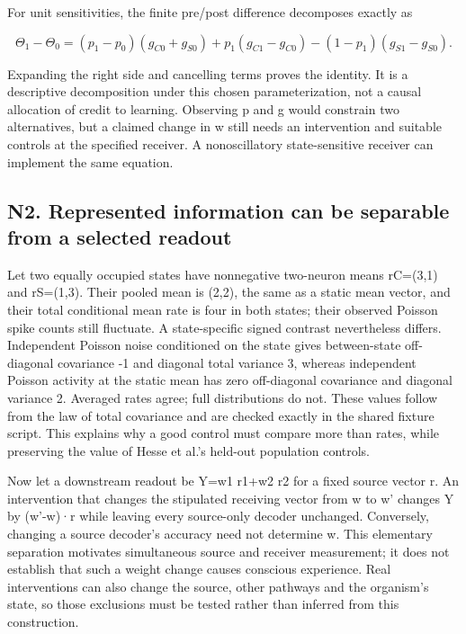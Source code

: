 \documentclass[
  american,
  11pt,
  letterpaper,
]{article}
\begin{document}
For unit sensitivities, the finite pre/post difference decomposes exactly as

\begin{equation}
\Theta_1-\Theta_0=(p_1-p_0)(g_{C0}+g_{S0})+p_1(g_{C1}-g_{C0})-(1-p_1)(g_{S1}-g_{S0}).\tag{N2}
\end{equation}

Expanding the right side and cancelling terms proves the identity. It is a descriptive decomposition under this chosen parameterization, not a causal allocation of credit to learning. Observing p and g would constrain two alternatives, but a claimed change in w still needs an intervention and suitable controls at the specified receiver. A nonoscillatory state-sensitive receiver can implement the same equation.

\subsection{N2. Represented information can be separable from a selected readout}\label{n2.-represented-information-can-be-separable-from-a-selected-readout}

Let two equally occupied states have nonnegative two-neuron means rC=(3,1) and rS=(1,3). Their pooled mean is (2,2), the same as a static mean vector, and their total conditional mean rate is four in both states; their observed Poisson spike counts still fluctuate. A state-specific signed contrast nevertheless differs. Independent Poisson noise conditioned on the state gives between-state off-diagonal covariance -1 and diagonal total variance 3, whereas independent Poisson activity at the static mean has zero off-diagonal covariance and diagonal variance 2. Averaged rates agree; full distributions do not. These values follow from the law of total covariance and are checked exactly in the shared fixture script. This explains why a good control must compare more than rates, while preserving the value of Hesse et al.'s held-out population controls.

Now let a downstream readout be Y=w1 r1+w2 r2 for a fixed source vector r. An intervention that changes the stipulated receiving vector from w to w' changes Y by (w'-w)·r while leaving every source-only decoder unchanged. Conversely, changing a source decoder's accuracy need not determine w. This elementary separation motivates simultaneous source and receiver measurement; it does not establish that such a weight change causes conscious experience. Real interventions can also change the source, other pathways and the organism's state, so those exclusions must be tested rather than inferred from this construction.
\end{document}
